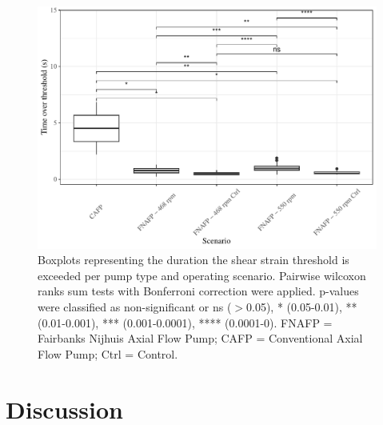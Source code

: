 \documentclass[fleqn,10pt]{wlscirep}
\begin{document}
\begin{figure}[ht]
  \centering
  \includegraphics[scale=0.7]{BDS_shearstress}
  \caption{Boxplots representing the duration the shear strain threshold is exceeded per pump type and operating scenario. Pairwise wilcoxon ranks sum tests with Bonferroni correction were applied. p-values were classified as non-significant or ns ($>$0.05), * (0.05-0.01), ** (0.01-0.001), *** (0.001-0.0001), **** (0.0001-0). FNAFP = Fairbanks Nijhuis Axial Flow Pump; CAFP = Conventional Axial Flow Pump; Ctrl = Control.}
  \label{fig:BDS_shearstress}
\end{figure}

\section*{Discussion}
\end{document}
